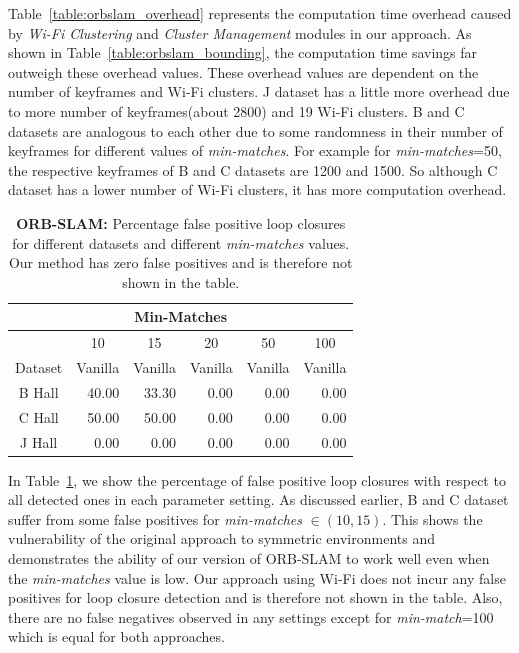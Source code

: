 Table~\ref{table:orbslam_overhead} represents the computation time overhead caused by {\it Wi-Fi Clustering} and {\it Cluster Management} modules in our approach. 
As shown in Table~\ref{table:orbslam_bounding}, the computation time savings far outweigh these overhead values. 
These overhead values are dependent on the number of keyframes and Wi-Fi clusters. 
J dataset has a little more overhead due to more number of keyframes(about 2800) and 19 Wi-Fi clusters. 
B and C datasets are analogous to each other due to some randomness in their number of keyframes for different values of {\it min-matches}. 
For example for {\it min-matches}=50, the respective keyframes of B and C datasets are 1200 and 1500. 
So although C dataset has a lower number of Wi-Fi clusters, it has more computation overhead. 
\begin{table}[t]
\caption{{\bf ORB-SLAM:} Percentage false positive loop closures for different datasets and different {\it min-matches} values. Our method has zero false positives and is therefore not shown in the table. }
\begin{center}
\begin{tabular}{| c | r | r | r | r | r |} 
\hline 
\multicolumn{6}{|c|}{{Min-Matches}} \\ 
\hline 
 & \multicolumn{1}{|c|}{10} & \multicolumn{1}{|c|}{15} & \multicolumn{1}{|c|}{20} & \multicolumn{1}{|c|}{50} & \multicolumn{1}{|c|}{100} \\ 
\hline 
 {Dataset} & \multicolumn{1}{|c|}{Vanilla} & \multicolumn{1}{|c|}{Vanilla} & \multicolumn{1}{|c|}{Vanilla} & \multicolumn{1}{|c|}{Vanilla} & \multicolumn{1}{|c|}{Vanilla} \\ 
\hline 
 B Hall & 40.00 & 33.30 & 0.00 & 0.00 & 0.00 \\ 
 C Hall & 50.00 & 50.00 & 0.00 & 0.00 & 0.00 \\ 
 J Hall & 0.00 & 0.00 & 0.00 & 0.00 & 0.00 \\  
\hline 
\end{tabular} 
\label{table:orbslam_false_positive}
\end{center}
\end{table}

In Table~\ref{table:orbslam_false_positive}, we show the percentage of false positive loop closures with respect to all detected ones in each parameter setting. 
As discussed earlier, B and C dataset suffer from some false positives for {\it min-matches} $\in (10, 15)$. %
This shows the vulnerability of the original approach to symmetric environments and demonstrates the ability of our version of ORB-SLAM to work well even when the {\it min-matches} value is low. 
Our approach using Wi-Fi does not incur any false positives for loop closure detection and is therefore not shown in the table. 
Also, there are no false negatives observed in any settings except for {\it min-match}=100 which is equal for both approaches.
